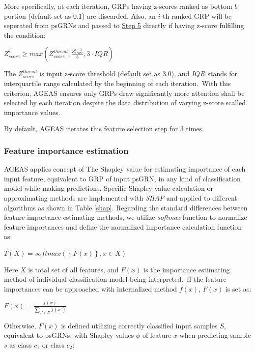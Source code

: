 \documentclass[fleqn,10pt]{wlscirep}
\begin{document}
    More specifically, at each iteration, GRPs having z-scores ranked as bottom $b$ portion (default set as 0.1) are discarded.
    Also, an $i$-th ranked GRP will be seperated from psGRNs and passed to \hyperref[step5]{Step 5} directly if having z-score fulfilling the condition:

    \centerline{
      $Z_{score}^{i} \ge max(Z_{score}^{thread}, \frac{Z_{score}^{i-1}}{3}, 3 \cdot IQR)$
    }

    \noindent The $Z_{score}^{thread}$ is input z-score threshold (default set as 3.0), and $IQR$ stands for interquartile range calculated by the beginning of each iteration.\
    With this criterion, AGEAS ensures only GRPs draw significantly more attention shall be selected by each iteration despite the data distribution of varying z-score scalled importance values.

    By default, AGEAS iterates this feature selection step for 3 times.

    \subsubsection*{Feature importance estimation}
      \label{features_importances}
      AGEAS applies concept of The Shapley value\cite{roth_1988} for estimating importance of each input feature, equivalent to GRP of input psGRN, in any kind of classification model while making predictions.
      Specific Shapley value calculation or approximating methods are implemented with \emph{SHAP}\cite{lundberg2017unified} and applied to different algorithms as shown in Table \ref{shap}.
      Regarding the standard differences between feature importance estimating methods, we utilize \emph{softmax} function to normalize feature importances and define the normalized importance calculation function as:

      \centerline{$T(X) = softmax(\left\{ F(x) \right\}, x \in X)$}

      \noindent Here $X$ is total set of all features, and $F(x)$ is the importance estimating method of individual classification model being interpreted.\
      If the feature importances can be approached with internalized method $f(x)$, $F(x)$ is set as:

      \centerline{$F(x) = \frac{f(x)}{\sum_{x' \in X} f(x')}$}

      \noindent Otherwise, $F(x)$ is defined utilizing correctly classified input samples $S$, equivalent to psGRNs, with Shapley values $\phi$ of feature $x$ when predicting sample $s$ as class $c_1$ or class $c_2$:\
\end{document}
